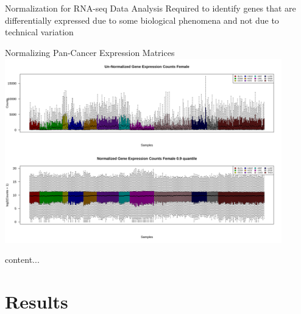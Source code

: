 \documentclass{beamer}
\begin{document}
	\begin{frame}{Normalization for RNA-seq Data Analysis}
		\centering Required to identify genes that are differentially expressed due to some biological phenomena and not due to technical variation
	\end{frame}

	\begin{frame}{Normalizing Pan-Cancer Expression Matrices}
		\includegraphics[width=12cm, height=8cm]{all_cancers-F_before_and_after_normalization_v.png}
	\end{frame}

	\begin{frame}
		content...
	\end{frame}

	\section{Results}

	
\end{document}
